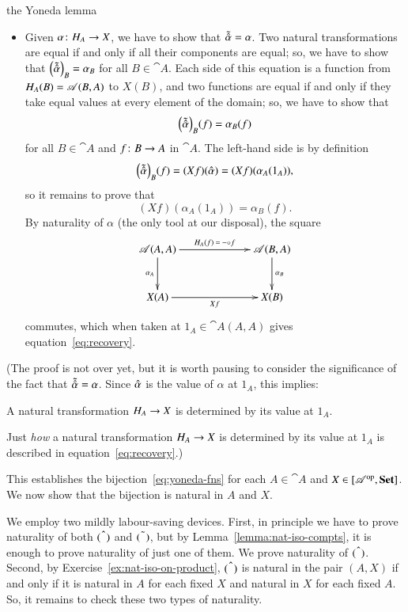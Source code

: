\begin{pfof}{the Yoneda lemma}
\begin{itemize}
\item
Given $\alpha\from \h_A \to X$, we have to show that $\tilde{\hat{\alpha}} =
\alpha$.  Two natural transformations are equal if and only if all their
components are equal; so, we have to show that
$\Bigl(\tilde{\hat{\alpha}}\Bigr)_B = \alpha_B$ for all $B \in \cat{A}$.
Each side of this equation is a function from $H_A(B) = \mathscr{A}(B, A)$ to
$X(B)$, and two functions are equal if and only if they take equal values
at every element of the domain; so, we have to show that
\[
\Bigl(\tilde{\hat{\alpha}}\Bigr)_B (f)
=
\alpha_B(f)
\]
for all $B \in \cat{A}$ and $f\from B \to A$ in $\cat{A}$.  The left-hand side
is by definition
\[
\Bigl(\tilde{\hat{\alpha}}\Bigr)_B (f)
=
(Xf)(\hat{\alpha})
=
(Xf)(\alpha_A(1_A)),
\]
so it remains to prove that
%
\begin{equation}
\label{eq:recovery}
(Xf)(\alpha_A(1_A)) = \alpha_B(f).
\end{equation}
%
By naturality of $\alpha$ (the only tool at our disposal), the square
\[
\xymatrix@C+4em@R+1ex{
\cat{A}(A, A) \ar[r]^{\h_A(f) \:=\: \dashbk \of f}
\ar[d]_{\alpha_A}    &
\cat{A}(B, A) \ar[d]^{\alpha_B} \\
X(A) \ar[r]_{Xf}        &
X(B)
}
\]
commutes, which when taken at $1_A \in \cat{A}(A, A)$ gives
equation~\eqref{eq:recovery}.
\end{itemize}

(The proof is not over yet, but it is worth pausing to consider the
significance of the fact that $\tilde{\hat{\alpha}} = \alpha$.  Since
$\hat{\alpha}$ is the value of $\alpha$ at $1_A$, this implies:
%
\begin{slogan}
A natural transformation $H_A \to X$ is determined by its
value at $1_A$.
\end{slogan}
%
Just \emph{how} a natural transformation $H_A \to X$ is determined by its
value at $1_A$ is described in equation~\eqref{eq:recovery}.)

This establishes the bijection~\eqref{eq:yoneda-fns} for each $A \in
\cat{A}$ and $X \in [\mathscr{A}^{\mathrm{op}},\mathbf{Set}]$.  We now show that the
bijection is natural in $A$ and $X$.

We employ two mildly labour-saving devices.  First, in principle we have
to prove naturality of both $\hat{(\hspace*{.5em})}$ and $\tilde{(\hspace*{.5em})}$, but by
Lemma~\ref{lemma:nat-iso-compts}, it is enough to prove naturality of just
one of them.  We prove naturality of $\hat{(\hspace*{.5em})}$.  Second, by
Exercise~\ref{ex:nat-iso-on-product}, $\hat{(\hspace*{.5em})}$ is natural in the pair
$(A, X)$ if and only if it is natural in $A$ for each fixed $X$ and natural
in $X$ for each fixed $A$.  So, it remains to check these two types of
naturality.


\end{pfof}
